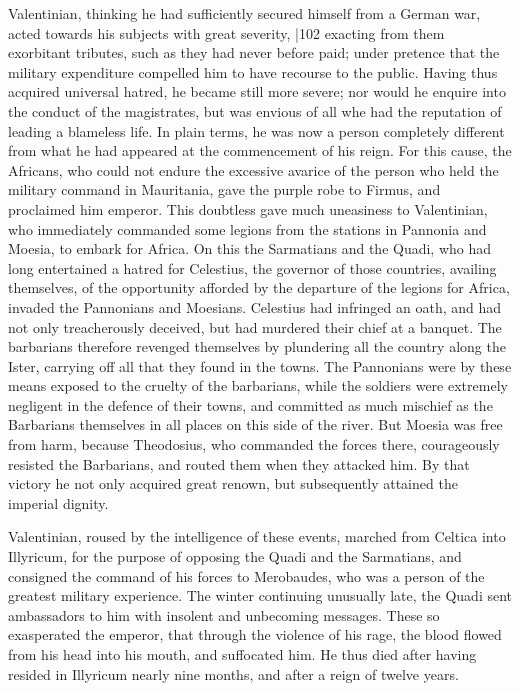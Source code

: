 Valentinian, thinking he had sufficiently secured himself from a German war, acted towards his subjects with great severity,
|102
exacting from them exorbitant tributes, such as they had never before paid; under pretence that the military expenditure compelled him to have recourse to the public. Having thus acquired universal hatred, he became still more severe; nor would he enquire into the conduct of the magistrates, but was envious of all whe had the reputation of leading a blameless life. In plain terms, he was now a person completely different from what he had appeared at the commencement of his reign. For this cause, the Africans, who could not endure the excessive avarice of the person who held the military command in Mauritania, gave the purple robe to Firmus, and proclaimed him emperor. This doubtless gave much uneasiness to Valentinian, who immediately commanded some legions from the stations in Pannonia and Moesia, to embark for Africa. On this the Sarmatians and the Quadi, who had long entertained a hatred for Celestius, the governor of those countries, availing themselves, of the opportunity afforded by the departure of the legions for Africa, invaded the Pannonians and Moesians. Celestius had infringed an oath, and had not only treacherously deceived, but had murdered their chief at a banquet. The barbarians therefore revenged themselves by plundering all the country along the Ister, carrying off all that they found in the towns. The Pannonians were by these means exposed to the cruelty of the barbarians, while the soldiers were extremely negligent in the defence of their towns, and committed as much mischief as the Barbarians themselves in all places on this side of the river. But Moesia was free from harm, because Theodosius, who commanded the forces there, courageously resisted the Barbarians, and routed them when they attacked him. By that victory he not only acquired great renown, but subsequently attained the imperial
dignity.

Valentinian, roused by the intelligence of these events, marched from Celtica into Illyricum, for the purpose of opposing the Quadi and the Sarmatians, and consigned the command of his forces to Merobaudes, who was a person of the greatest military experience. The winter continuing unusually late, the Quadi
sent ambassadors to him with insolent and unbecoming messages. These so exasperated the emperor, that through the violence of his rage, the blood flowed from his head into his mouth, and suffocated him. He thus died after having resided in Illyricum nearly nine months, and after a reign of twelve years.

